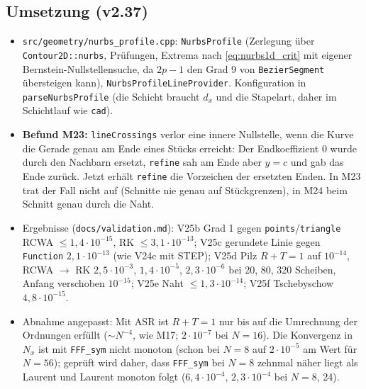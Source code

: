 \subsection{Umsetzung (v2.37)}
\begin{itemize}[nosep]
  \item \verb|src/geometry/nurbs_profile.cpp|: \verb|NurbsProfile| (Zerlegung über \verb|Contour2D::nurbs|, Prüfungen,
        Extrema nach \eqref{eq:nurbs1d_crit} mit eigener Bernstein-Nullstellensuche, da $2p-1$ den Grad 9 von
        \verb|BezierSegment| übersteigen kann), \verb|NurbsProfileLineProvider|. Konfiguration in
        \verb|parseNurbsProfile| (die Schicht braucht $d_x$ und die Stapelart, daher im Schichtlauf wie \verb|cad|).
  \item \textbf{Befund M23:} \verb|lineCrossings| verlor eine innere Nullstelle, wenn die Kurve die Gerade genau am
        Ende eines Stücks erreicht: Der Endkoeffizient 0 wurde durch den Nachbarn ersetzt, \verb|refine| sah am Ende
        aber $y=c$ und gab das Ende zurück. Jetzt erhält \verb|refine| die Vorzeichen der ersetzten Enden. In M23
        trat der Fall nicht auf (Schnitte nie genau auf Stückgrenzen), in M24 beim Schnitt genau durch die Naht.
  \item Ergebnisse (\verb|docs/validation.md|): V25b Grad 1 gegen \verb|points|/\verb|triangle| RCWA $\le1{,}4\cdot10^{-15}$,
        RK $\le3{,}1\cdot10^{-13}$; V25c gerundete Linie gegen \verb|Function| $2{,}1\cdot10^{-13}$ (wie V24c mit
        STEP); V25d Pilz $R+T=1$ auf $10^{-14}$, RCWA $\to$ RK $2{,}5\cdot10^{-3}$, $1{,}4\cdot10^{-5}$,
        $2{,}3\cdot10^{-6}$ bei 20, 80, 320 Scheiben, Anfang verschoben $10^{-15}$; V25e Naht $\le1{,}3\cdot10^{-14}$;
        V25f Tschebyschow $4{,}8\cdot10^{-15}$.
  \item Abnahme angepasst: Mit ASR ist $R+T=1$ nur bis auf die Umrechnung der Ordnungen erfüllt ($\sim N^{-4}$, wie
        M17; $2\cdot10^{-7}$ bei $N=16$). Die Konvergenz in $N_x$ ist mit \verb|FFF_sym| nicht monoton (schon bei
        $N=8$ auf $2\cdot10^{-5}$ am Wert für $N=56$); geprüft wird daher, dass \verb|FFF_sym| bei $N=8$ zehnmal näher
        liegt als Laurent und Laurent monoton folgt ($6{,}4\cdot10^{-4}$, $2{,}3\cdot10^{-4}$ bei $N=8$, 24).
\end{itemize}

